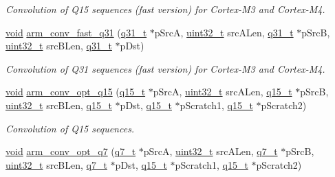\begin{DoxyCompactItemize}
\begin{DoxyCompactList}\small\item\em Convolution of Q15 sequences (fast version) for Cortex-\/\-M3 and Cortex-\/\-M4. \end{DoxyCompactList}\item 
\hyperlink{group___n_a_m_e_ga18028b8badbf1ea7e704ccac3c488e82}{void} \hyperlink{group___conv_ga51112dcdf9b3624eb05182cdc4da9ec0}{arm\-\_\-conv\-\_\-fast\-\_\-q31} (\hyperlink{arm__math_8h_adc89a3547f5324b7b3b95adec3806bc0}{q31\-\_\-t} $\ast$p\-Src\-A, \hyperlink{stdint_8h_a435d1572bf3f880d55459d9805097f62}{uint32\-\_\-t} src\-A\-Len, \hyperlink{arm__math_8h_adc89a3547f5324b7b3b95adec3806bc0}{q31\-\_\-t} $\ast$p\-Src\-B, \hyperlink{stdint_8h_a435d1572bf3f880d55459d9805097f62}{uint32\-\_\-t} src\-B\-Len, \hyperlink{arm__math_8h_adc89a3547f5324b7b3b95adec3806bc0}{q31\-\_\-t} $\ast$p\-Dst)
\begin{DoxyCompactList}\small\item\em Convolution of Q31 sequences (fast version) for Cortex-\/\-M3 and Cortex-\/\-M4. \end{DoxyCompactList}\item 
\hyperlink{group___n_a_m_e_ga18028b8badbf1ea7e704ccac3c488e82}{void} \hyperlink{group___conv_gac77dbcaef5c754cac27eab96c4753a3c}{arm\-\_\-conv\-\_\-opt\-\_\-q15} (\hyperlink{arm__math_8h_ab5a8fb21a5b3b983d5f54f31614052ea}{q15\-\_\-t} $\ast$p\-Src\-A, \hyperlink{stdint_8h_a435d1572bf3f880d55459d9805097f62}{uint32\-\_\-t} src\-A\-Len, \hyperlink{arm__math_8h_ab5a8fb21a5b3b983d5f54f31614052ea}{q15\-\_\-t} $\ast$p\-Src\-B, \hyperlink{stdint_8h_a435d1572bf3f880d55459d9805097f62}{uint32\-\_\-t} src\-B\-Len, \hyperlink{arm__math_8h_ab5a8fb21a5b3b983d5f54f31614052ea}{q15\-\_\-t} $\ast$p\-Dst, \hyperlink{arm__math_8h_ab5a8fb21a5b3b983d5f54f31614052ea}{q15\-\_\-t} $\ast$p\-Scratch1, \hyperlink{arm__math_8h_ab5a8fb21a5b3b983d5f54f31614052ea}{q15\-\_\-t} $\ast$p\-Scratch2)
\begin{DoxyCompactList}\small\item\em Convolution of Q15 sequences. \end{DoxyCompactList}\item 
\hyperlink{group___n_a_m_e_ga18028b8badbf1ea7e704ccac3c488e82}{void} \hyperlink{group___conv_ga4c7cf073e89d6d57cc4e711f078c3f68}{arm\-\_\-conv\-\_\-opt\-\_\-q7} (\hyperlink{arm__math_8h_ae541b6f232c305361e9b416fc9eed263}{q7\-\_\-t} $\ast$p\-Src\-A, \hyperlink{stdint_8h_a435d1572bf3f880d55459d9805097f62}{uint32\-\_\-t} src\-A\-Len, \hyperlink{arm__math_8h_ae541b6f232c305361e9b416fc9eed263}{q7\-\_\-t} $\ast$p\-Src\-B, \hyperlink{stdint_8h_a435d1572bf3f880d55459d9805097f62}{uint32\-\_\-t} src\-B\-Len, \hyperlink{arm__math_8h_ae541b6f232c305361e9b416fc9eed263}{q7\-\_\-t} $\ast$p\-Dst, \hyperlink{arm__math_8h_ab5a8fb21a5b3b983d5f54f31614052ea}{q15\-\_\-t} $\ast$p\-Scratch1, \hyperlink{arm__math_8h_ab5a8fb21a5b3b983d5f54f31614052ea}{q15\-\_\-t} $\ast$p\-Scratch2)

\end{DoxyCompactItemize}
